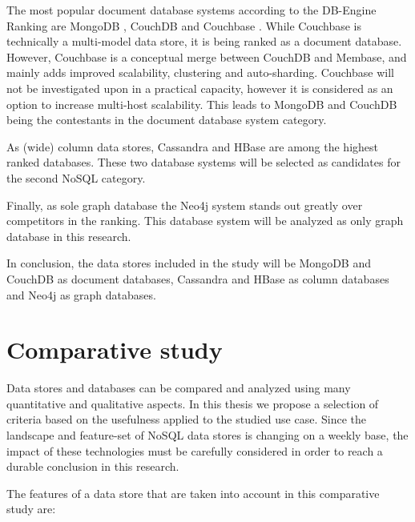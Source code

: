 The most popular document database systems according to the DB-Engine Ranking are MongoDB \autocite{MongoDB2009}, CouchDB \autocite{CouchDB2005} and Couchbase \autocite{Couchbase2010}.
While Couchbase is technically a multi-model data store, it is being ranked as a document database.
However, Couchbase is a conceptual merge between CouchDB and Membase, and mainly adds improved scalability, clustering and auto-sharding.
Couchbase will not be investigated upon in a practical capacity, however it is considered as an option to increase multi-host scalability.
This leads to MongoDB and CouchDB being the contestants in the document database system category.

As (wide) column data stores, Cassandra \autocite{Cassandra2008} and HBase \autocite{HBase2005} are among the highest ranked databases.
These two database systems will be selected as candidates for the second NoSQL category.

Finally, as sole graph database the Neo4j system \autocite{Neo4j2007} stands out greatly over competitors in the ranking.
This database system will be analyzed as only graph database in this research.

In conclusion, the data stores included in the study will be MongoDB and CouchDB as document databases, Cassandra and HBase as column databases and Neo4j as graph databases.

\section{Comparative study}
\label{sec:comparative-study}

Data stores and databases can be compared and analyzed using many quantitative and qualitative aspects.
In this thesis we propose a selection of criteria based on the usefulness applied to the studied use case.
Since the landscape and feature-set of NoSQL data stores is changing on a weekly base, the impact of these technologies must be carefully considered in order to reach a durable conclusion in this research.

The features of a data store that are taken into account in this comparative study are:

